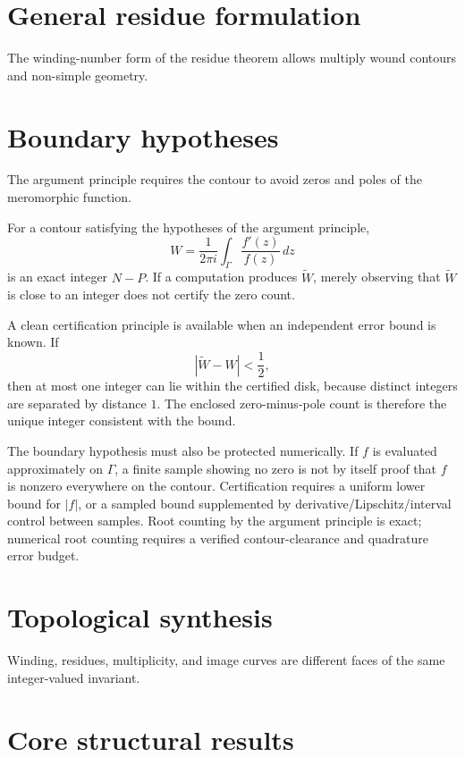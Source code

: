 \section{General residue formulation}
The winding-number form of the residue theorem allows multiply wound contours and non-simple geometry.

\section{Boundary hypotheses}
The argument principle requires the contour to avoid zeros and poles of the meromorphic function.

\begin{remark}
For a contour satisfying the hypotheses of the argument principle,
\[
W
=
\frac{1}{2\pi i}
\int_\Gamma\frac{f'(z)}{f(z)}\,dz
\]
is an exact integer \(N-P\).  If a computation produces
\(\widetilde W\), merely observing that \(\widetilde W\) is close to an integer
does not certify the zero count.

A clean certification principle is available when an independent error bound
is known.  If
\[
|\widetilde W-W|<\frac12,
\]
then at most one integer can lie within the certified disk, because distinct
integers are separated by distance \(1\).  The enclosed zero-minus-pole count
is therefore the unique integer consistent with the bound.

The boundary hypothesis must also be protected numerically.  If \(f\) is
evaluated approximately on \(\Gamma\), a finite sample showing no zero is not
by itself proof that \(f\) is nonzero everywhere on the contour.  Certification
requires a uniform lower bound for \(|f|\), or a sampled bound supplemented by
derivative/Lipschitz/interval control between samples.  Root counting by the
argument principle is exact; numerical root counting requires a verified
contour-clearance and quadrature error budget.
\end{remark}

\section{Topological synthesis}
Winding, residues, multiplicity, and image curves are different faces of the same integer-valued invariant.

\section{Core structural results}

